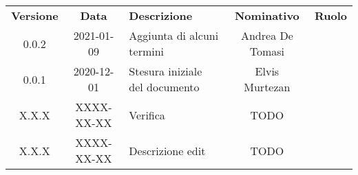 {
    \renewcommand{\arraystretch}{1.5}
    \centering
    \begin{longtable}{ c c  C{4cm}  c  c }
        \rowcolor{\primaryColor}
        \textcolor{\secondaryColor}{
        \textbf{Versione}}     & \textcolor{\secondaryColor}{\textbf{Data}}       & \textcolor{\secondaryColor}
        {\textbf{Descrizione}} & \textcolor{\secondaryColor}{\textbf{Nominativo}} & \textcolor{\secondaryColor}{\textbf{Ruolo}}                          \\


        0.0.2                  & 2021-01-09                                       & Aggiunta di alcuni termini                            & Andrea De Tomasi & \redattore{}\\
        0.0.1                  & 2020-12-01                                       & Stesura iniziale del documento              & Elvis Murtezan & \responsabile{} \\
        X.X.X                  & XXXX-XX-XX                                       & Verifica                                    & TODO & \verificatore{} \\
        X.X.X                  & XXXX-XX-XX                                       & Descrizione edit                            & TODO & \redattore{}    \\
    \end{longtable}
}
